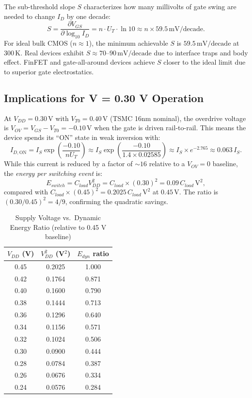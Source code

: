 The sub-threshold slope $S$ characterizes how many millivolts of gate swing are needed to
change $I_D$ by one decade:
\[
  S = \frac{\partial V_{GS}}{\partial \log_{10} I_D}
    = n \cdot U_T \cdot \ln 10 \approx n \times 59.5\,\text{mV/decade}.
\]
For ideal bulk CMOS ($n \approx 1$), the minimum achievable $S$ is $59.5\,\text{mV/decade}$
at $300\,\text{K}$.  Real devices exhibit $S \approx 70$--$90\,\text{mV/decade}$ due to
interface traps and body effect.  FinFET and gate-all-around devices achieve $S$ closer to
the ideal limit due to superior gate electrostatics.

\subsection{Implications for V = 0.30 V Operation}

At $V_{DD} = 0.30\,\text{V}$ with $V_{T0} = 0.40\,\text{V}$ (TSMC 16nm nominal), the
overdrive voltage is $V_{OV} = V_{GS} - V_{T0} = -0.10\,\text{V}$ when the gate is driven
rail-to-rail.  This means the device spends its ``ON'' state in weak inversion with:
\[
  I_{D,\text{ON}} = I_S \exp\!\left(\frac{-0.10}{n U_T}\right)
    \approx I_S \exp\!\left(\frac{-0.10}{1.4 \times 0.02585}\right)
    \approx I_S \times e^{-2.765} \approx 0.063 \, I_S.
\]
While this current is reduced by a factor of $\sim 16$ relative to a $V_{OV}=0$ baseline,
the \emph{energy per switching event} is:
\[
  E_{switch} = C_{load} V_{DD}^2 = C_{load} \times (0.30)^2 = 0.09 \, C_{load}\,\text{V}^2,
\]
compared with $C_{load} \times (0.45)^2 = 0.2025 \, C_{load}\,\text{V}^2$ at $0.45\,\text{V}$.
The ratio is $(0.30/0.45)^2 = 4/9$, confirming the quadratic savings.

\begin{table}[htbp]
\centering
\caption{Supply Voltage vs.\ Dynamic Energy Ratio (relative to 0.45 V baseline)}
\label{tab:v_energy}
\begin{tabular}{ccc}
\hline
$V_{DD}$ (V) & $V_{DD}^2$ (V$^2$) & $E_{dyn}$ ratio \\
\hline
0.45 & 0.2025 & 1.000 \\
0.42 & 0.1764 & 0.871 \\
0.40 & 0.1600 & 0.790 \\
0.38 & 0.1444 & 0.713 \\
0.36 & 0.1296 & 0.640 \\
0.34 & 0.1156 & 0.571 \\
0.32 & 0.1024 & 0.506 \\
0.30 & 0.0900 & 0.444 \\
0.28 & 0.0784 & 0.387 \\
0.26 & 0.0676 & 0.334 \\
0.24 & 0.0576 & 0.284 \\
\hline
\end{tabular}
\end{table}


